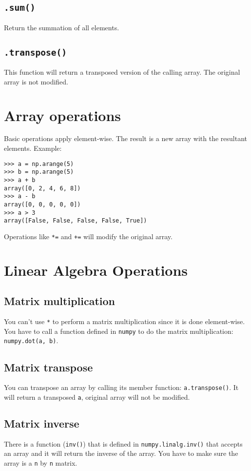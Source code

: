 \documentclass[12pt]{book}
\begin{document}
\subsection{\texttt{.sum()}}
\label{sec:org9973402}
Return the summation of all elements.
\subsection{\texttt{.transpose()}}
\label{sec:org553026a}
This function will return a transposed version of the calling array. The original array is not modified.
\section{Array operations}
\label{sec:org2891ada}
Basic operations apply element-wise. The result is a new array with the resultant elements. Example:
\begin{verbatim}
>>> a = np.arange(5)
>>> b = np.arange(5)
>>> a + b
array([0, 2, 4, 6, 8])
>>> a - b
array([0, 0, 0, 0, 0])
>>> a > 3
array([False, False, False, False, True])
\end{verbatim}

Operations like \texttt{*=} and \texttt{+=} will modify the original array.
\section{Linear Algebra Operations}
\label{sec:org1ef4c80}
\subsection{Matrix multiplication}
\label{sec:org45cc834}
You can't use \texttt{*} to perform a matrix multiplication since it is done element-wise. You have to call a function defined in \texttt{numpy} to do the matrix multiplication: \texttt{numpy.dot(a, b)}.
\subsection{Matrix transpose}
\label{sec:org7902734}
You can transpose an array by calling its member function: \texttt{a.transpose()}. It will return a transposed \texttt{a}, original array will not be modified.
\subsection{Matrix inverse}
\label{sec:org77dcc75}
There is a function (\texttt{inv()}) that is defined in \texttt{numpy.linalg.inv()} that accepts an array and it will return the inverse of the array. You have to make sure the array is a \texttt{n} by \texttt{n} matrix.
\end{document}
